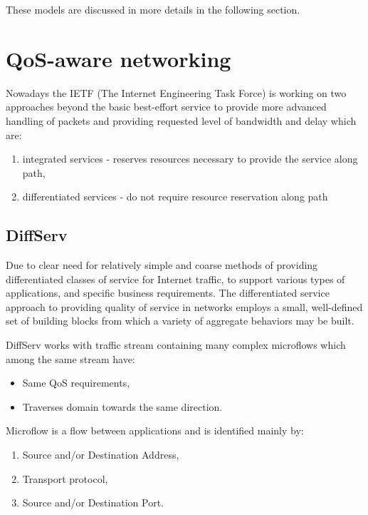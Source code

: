 \documentclass[11pt]{book}
\begin{document}
	These models are discussed in more details in the following section.
	

    \section{QoS-aware networking}


	  Nowadays the IETF (The Internet Engineering Task Force) is working on two approaches
	  beyond the basic best-effort service to provide more advanced handling of packets and providing requested level 
	  of bandwidth and delay which are:

    \begin{enumerate}
      \item integrated services - reserves resources necessary to provide the service along path,
      \item differentiated services - do not require resource reservation along path
    \end{enumerate}
	
		\subsection{DiffServ}
		
			Due to clear need for relatively simple and coarse methods of providing differentiated classes
			of service for Internet traffic, to support various types of applications, and specific business
			requirements. The differentiated service approach to providing quality of service in networks 
			employs a small, well-defined set of building blocks from which a variety of aggregate behaviors
			may be built. \cite{qos}
			
			DiffServ works with traffic stream containing many complex microflows which among the same stream have:

			\begin{itemize}
				\item Same QoS requirements,
				\item Traverses domain towards the same direction.
			\end{itemize}
			
			Microflow is a flow between applications and is identified mainly by:

			\begin{enumerate}
				\item Source and/or Destination Address,
				\item Transport protocol,
				\item Source and/or Destination Port.
			\end{enumerate}
			
\end{document}
